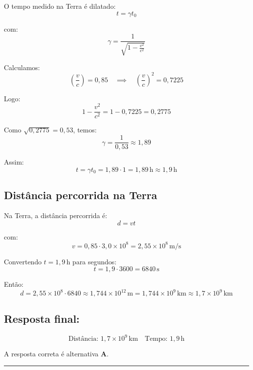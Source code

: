 \documentclass[a4paper,12pt]{article}
\begin{document}
\begin{flushleft}
O tempo medido na Terra é dilatado:
\[
t = \gamma t_0
\]

com:
\[
\gamma = \frac{1}{\sqrt{1-\frac{v^2}{c^2}}}
\]

Calculamos:
\[
\left( \frac{v}{c} \right) = 0{,}85 \quad \implies \quad \left( \frac{v}{c} \right)^2 = 0{,}7225
\]

Logo:
\[
1 - \frac{v^2}{c^2} = 1 - 0{,}7225 = 0{,}2775
\]

Como \(\sqrt{0{,}2775} = 0{,}53\), temos:
\[
\gamma = \frac{1}{0{,}53} \approx 1{,}89
\]

Assim:
\[
t = \gamma t_0 = 1{,}89 \cdot 1 = 1{,}89\,\mathrm{h} \approx 1{,}9\,\mathrm{h}
\]

\subsection*{Distância percorrida na Terra}

Na Terra, a distância percorrida é:
\[
d = v t
\]

com:
\[
v = 0{,}85 \cdot 3{,}0 \times 10^8 = 2{,}55 \times 10^8\, \mathrm{m/s}
\]

Convertendo \(t = 1{,}9\,\mathrm{h}\) para segundos:
\[
t = 1{,}9 \cdot 3600 = 6840\,\mathrm{s}
\]

Então:
\[
d = 2{,}55 \times 10^8 \cdot 6840 \approx 1{,}744 \times 10^{12}\,\mathrm{m} = 1{,}744 \times 10^9\,\mathrm{km} \approx 1{,}7 \times 10^9\,\mathrm{km}
\]

\subsection*{Resposta final:}

\[
\boxed{
\text{Distância: } 1{,}7 \times 10^9\,\mathrm{km} \quad \text{Tempo: } 1{,}9\,\mathrm{h}
}
\]


A resposta correta é alternativa \colorbox{green!50}{\textbf{A}}.
\end{flushleft}

\noindent\rule{\linewidth}{0.6pt}\\
\end{document}
